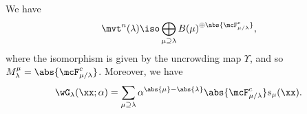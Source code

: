 \begin{theo}
\label{thm:flagged_decomposition}
We have
\[
\mvt^n(\lambda) \iso \bigoplus_{\mu \supseteq \lambda} B(\mu)^{\oplus \abs{\mcF^c_{\mu/\lambda}}},
\]
where the isomorphism is given by the uncrowding map $\Upsilon$, and so $M_{\lambda}^{\mu} =  \abs{\mcF^c_{\mu/\lambda}}$. Moreover, we have
\[
\wG_{\lambda}(\xx; \alpha) = \sum_{\mu \supseteq \lambda} \alpha^{\abs{\mu}-\abs{\lambda}} \abs{\mcF^c_{\mu/\lambda}} s_{\mu}(\xx).
\]
\end{theo}
